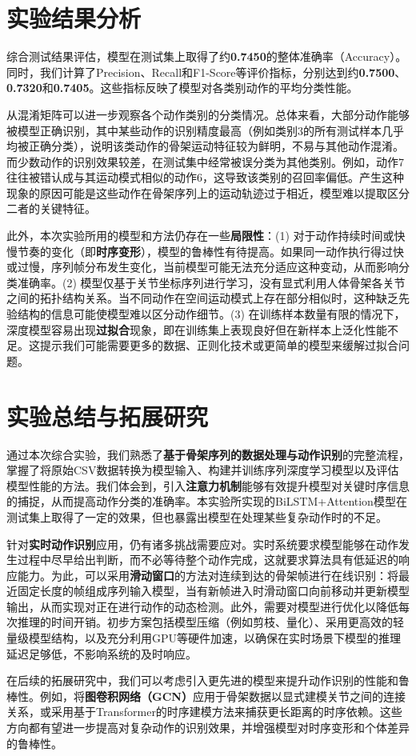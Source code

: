 \documentclass[UTF8]{article}
\begin{document}
\section{实验结果分析}

综合测试结果评估，模型在测试集上取得了约\textbf{0.7450}的整体准确率（Accuracy）。同时，我们计算了Precision、Recall和F1-Score等评价指标，分别达到约\textbf{0.7500}、\textbf{0.7320}和\textbf{0.7405}。这些指标反映了模型对各类别动作的平均分类性能。

从混淆矩阵可以进一步观察各个动作类别的分类情况。总体来看，大部分动作能够被模型正确识别，其中某些动作的识别精度最高（例如类别3的所有测试样本几乎均被正确分类），说明该类动作的骨架运动特征较为鲜明，不易与其他动作混淆。而少数动作的识别效果较差，在测试集中经常被误分类为其他类别。例如，动作7往往被错认成与其运动模式相似的动作6，这导致该类别的召回率偏低。产生这种现象的原因可能是这些动作在骨架序列上的运动轨迹过于相近，模型难以提取区分二者的关键特征。

此外，本次实验所用的模型和方法仍存在一些\textbf{局限性}：(1) 对于动作持续时间或快慢节奏的变化（即\textbf{时序变形}），模型的鲁棒性有待提高。如果同一动作执行得过快或过慢，序列帧分布发生变化，当前模型可能无法充分适应这种变动，从而影响分类准确率。(2) 模型仅基于关节坐标序列进行学习，没有显式利用人体骨架各关节之间的拓扑结构关系。当不同动作在空间运动模式上存在部分相似时，这种缺乏先验结构的信息可能使模型难以区分动作细节。(3) 在训练样本数量有限的情况下，深度模型容易出现\textbf{过拟合}现象，即在训练集上表现良好但在新样本上泛化性能不足。这提示我们可能需要更多的数据、正则化技术或更简单的模型来缓解过拟合问题。

\section{实验总结与拓展研究}

通过本次综合实验，我们熟悉了\textbf{基于骨架序列的数据处理与动作识别}的完整流程，掌握了将原始CSV数据转换为模型输入、构建并训练序列深度学习模型以及评估模型性能的方法。我们体会到，引入\textbf{注意力机制}能够有效提升模型对关键时序信息的捕捉，从而提高动作分类的准确率。本实验所实现的BiLSTM+Attention模型在测试集上取得了一定的效果，但也暴露出模型在处理某些复杂动作时的不足。

针对\textbf{实时动作识别}应用，仍有诸多挑战需要应对。实时系统要求模型能够在动作发生过程中尽早给出判断，而不必等待整个动作完成，这就要求算法具有低延迟的响应能力。为此，可以采用\textbf{滑动窗口}的方法对连续到达的骨架帧进行在线识别：将最近固定长度的帧组成序列输入模型，当有新帧进入时滑动窗口向前移动并更新模型输出，从而实现对正在进行动作的动态检测。此外，需要对模型进行优化以降低每次推理的时间开销。初步方案包括模型压缩（例如剪枝、量化）、采用更高效的轻量级模型结构，以及充分利用GPU等硬件加速，以确保在实时场景下模型的推理延迟足够低，不影响系统的及时响应。

在后续的拓展研究中，我们可以考虑引入更先进的模型来提升动作识别的性能和鲁棒性。例如，将\textbf{图卷积网络（GCN）}应用于骨架数据以显式建模关节之间的连接关系，或采用基于Transformer的时序建模方法来捕获更长距离的时序依赖。这些方向都有望进一步提高对复杂动作的识别效果，并增强模型对时序变形和个体差异的鲁棒性。
\end{document}
